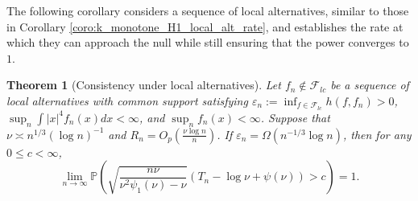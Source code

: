\documentclass[12pt,letterpaper, twoside, openany]{article}
\theoremstyle{plain}
\newtheorem{theorem}{Theorem}[section]
\begin{document}
		

The following corollary considers a sequence of local alternatives, similar to those in Corollary \ref{coro:k_monotone_H1_local_alt_rate}, and establishes the rate at which they can approach the null while still ensuring that the power converges to $1$.


\begin{theorem}[Consistency under local alternatives]\label{thm:lc_H1_local_alt_rate}
            Let $f_{n} \notin \mathcal{F}_{lc}$ be a sequence of local alternatives with common support satisfying $\varepsilon_n := \inf_{f \in \mathcal{F}_{lc}} h(f, f_n) > 0$,   $\sup_n \int |x|^4 f_n(x) dx < \infty$, and $\sup_n f_n(x) < \infty$. 
    Suppose that $\nu \asymp n^{1/3}(\log n)^{-1}$ and $R_n = O_p(\frac{\nu \log n}{n})$. If $\varepsilon_{n} = \Omega(n^{-1/3} \log n)$, then for any $0 \leq c < \infty$,
    \begin{equation*}
\lim_{n \rightarrow \infty} \mathbb{P}     \left(
\sqrt{ \frac{n\nu}{\nu^2\psi_1(\nu)-\nu}} \left( T_n -  \log \nu +  \psi(\nu) \right) > c\right) = 1.
\end{equation*}
\end{theorem}
		

		
		
\end{document}
